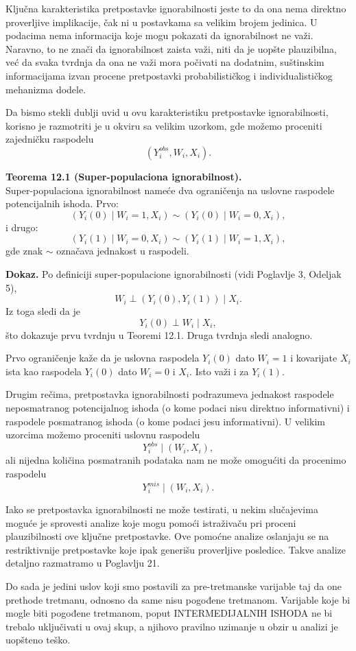 \documentclass[12pt, a4paper]{article}
\begin{document}
Ključna karakteristika pretpostavke ignorabilnosti jeste to da ona nema direktno proverljive implikacije, čak ni u postavkama sa velikim brojem jedinica. U podacima nema informacija koje mogu pokazati da ignorabilnost ne važi. Naravno, to ne znači da ignorabilnost zaista važi, niti da je uopšte plauzibilna, već da svaka tvrdnja da ona ne važi mora počivati na dodatnim, suštinskim informacijama izvan procene pretpostavki probabilističkog i individualističkog mehanizma dodele.

Da bismo stekli dublji uvid u ovu karakteristiku pretpostavke ignorabilnosti, korisno je razmotriti je u okviru sa velikim uzorkom, gde možemo proceniti zajedničku raspodelu
\[
(Y_i^{obs}, W_i, X_i).
\]

\textbf{Teorema 12.1 (Super-populaciona ignorabilnost).} \\
Super-populaciona ignorabilnost nameće dva ograničenja na uslovne raspodele potencijalnih ishoda. Prvo:
\[
(Y_i(0) \mid W_i = 1, X_i) \sim (Y_i(0) \mid W_i = 0, X_i),
\]
i drugo:
\[
(Y_i(1) \mid W_i = 0, X_i) \sim (Y_i(1) \mid W_i = 1, X_i),
\]
gde znak \(\sim\) označava jednakost u raspodeli.

\textbf{Dokaz.} Po definiciji super-populacione ignorabilnosti (vidi Poglavlje 3, Odeljak 5),
\[
W_i \perp (Y_i(0), Y_i(1)) \mid X_i.
\]
Iz toga sledi da je
\[
Y_i(0) \perp W_i \mid X_i,
\]
što dokazuje prvu tvrdnju u Teoremi 12.1. Druga tvrdnja sledi analogno.

Prvo ograničenje kaže da je uslovna raspodela \(Y_i(0)\) dato \(W_i = 1\) i kovarijate \(X_i\) ista kao raspodela \(Y_i(0)\) dato \(W_i = 0\) i \(X_i\). Isto važi i za \(Y_i(1)\).

Drugim rečima, pretpostavka ignorabilnosti podrazumeva jednakost raspodele neposmatranog potencijalnog ishoda (o kome podaci nisu direktno informativni) i raspodele posmatranog ishoda (o kome podaci jesu informativni). U velikim uzorcima možemo proceniti uslovnu raspodelu
\[
Y_i^{obs} \mid (W_i, X_i),
\]
ali nijedna količina posmatranih podataka nam ne može omogućiti da procenimo raspodelu
\[
Y_i^{mis} \mid (W_i, X_i).
\]

Iako se pretpostavka ignorabilnosti ne može testirati, u nekim slučajevima moguće je sprovesti analize koje mogu pomoći istraživaču pri proceni plauzibilnosti ove ključne pretpostavke. Ove pomoćne analize oslanjaju se na restriktivnije pretpostavke koje ipak generišu proverljive posledice. Takve analize detaljno razmatramo u Poglavlju 21.

Do sada je jedini uslov koji smo postavili za pre-tretmanske varijable taj da one prethode tretmanu, odnosno da same nisu pogođene tretmanom. Varijable koje bi mogle biti pogođene tretmanom, poput INTERMEDIJALNIH ISHODA ne bi trebalo uključivati u ovaj skup, a njihovo pravilno uzimanje u obzir u analizi je uopšteno teško.
\end{document}
